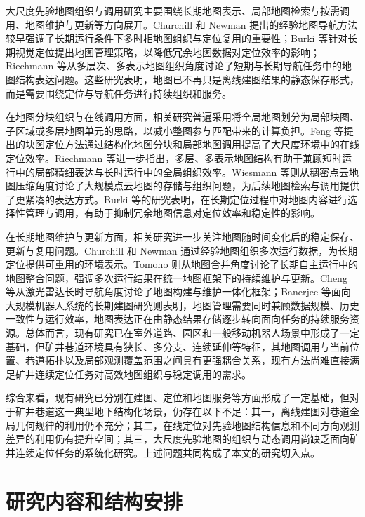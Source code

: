 大尺度先验地图组织与调用研究主要围绕长期地图表示、局部地图检索与按需调用、地图维护与更新等方向展开。Churchill 和 Newman 提出的经验地图导航方法较早强调了长期运行条件下多时相地图组织与定位复用的重要性\cite{Churchill_2013}；Burki 等针对长期视觉定位提出地图管理策略，以降低冗余地图数据对定位效率的影响\cite{Burki_2018}；Riechmann 等从多层次、多表示地图组织角度讨论了短期与长期导航任务中的地图结构表达问题\cite{Riechmann_2022}。这些研究表明，地图已不再只是离线建图结果的静态保存形式，而是需要围绕定位与导航任务进行持续组织和服务。

在地图分块组织与在线调用方面，相关研究普遍采用将全局地图划分为局部块图、子区域或多层地图单元的思路，以减小整图参与匹配带来的计算负担。Feng 等提出的块图定位方法通过结构化地图分块和局部地图调用提高了大尺度环境中的在线定位效率\cite{Feng_2024}。Riechmann 等进一步指出，多层、多表示地图结构有助于兼顾短时运行中的局部精细表达与长时运行中的全局组织效率\cite{Riechmann_2022}。Wiesmann 等则从稠密点云地图压缩角度讨论了大规模点云地图的存储与组织问题，为后续地图检索与调用提供了更紧凑的表达方式\cite{Wiesmann_2021}。Burki 等的研究表明，在长期定位过程中对地图内容进行选择性管理与调用，有助于抑制冗余地图信息对定位效率和稳定性的影响\cite{Burki_2018}。

在长期地图维护与更新方面，相关研究进一步关注地图随时间变化后的稳定保存、更新与复用问题。Churchill 和 Newman 通过经验地图组织多次运行数据，为长期定位提供可重用的环境表示\cite{Churchill_2013}。Tomono 则从地图合并角度讨论了长期自主运行中的地图整合问题，强调多次运行结果在统一地图框架下的持续维护与更新\cite{Tomono_2019}。Cheng 等从激光雷达长时导航角度讨论了地图构建与维护一体化框架\cite{Cheng_2024}；Banerjee 等面向大规模机器人系统的长期建图研究则表明，地图管理需要同时兼顾数据规模、历史一致性与运行效率，地图表达正在由静态结果存储逐步转向面向任务的持续服务资源\cite{Banerjee_2023}。总体而言，现有研究已在室外道路、园区和一般移动机器人场景中形成了一定基础，但矿井巷道环境具有狭长、多分支、连续延伸等特征，其地图调用与当前位置、巷道拓扑以及局部观测覆盖范围之间具有更强耦合关系，现有方法尚难直接满足矿井连续定位任务对高效地图组织与稳定调用的需求。

综合来看，现有研究已分别在建图、定位和地图服务等方面形成了一定基础，但对于矿井巷道这一典型地下结构化场景，仍存在以下不足：其一，离线建图对巷道全局几何规律的利用仍不充分；其二，在线定位对先验地图结构信息和不同方向观测差异的利用仍有提升空间；其三，大尺度先验地图的组织与动态调用尚缺乏面向矿井连续定位任务的系统化研究。上述问题共同构成了本文的研究切入点。

\section{研究内容和结构安排}

